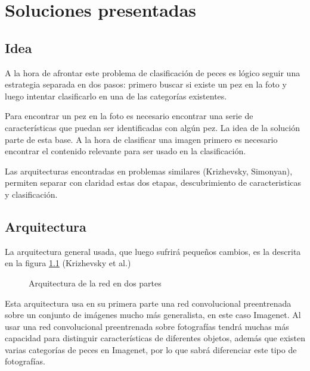 
\chapter{Soluciones presentadas} %

\label{ChapterX} %

\section{Idea}
A la hora de afrontar este problema de clasificación de peces es lógico
seguir una estrategia separada en dos pasos: primero buscar si
existe un pez en la foto y luego intentar clasificarlo en una de las 
categorías existentes. 

Para encontrar un pez en la foto es necesario encontrar una serie de
características que puedan ser identificadas con algún pez. La idea de 
la solución parte de esta base. A la hora de clasificar una imagen
primero es necesario encontrar el contenido relevante para ser usado
en la clasificación.

Las arquitecturas encontradas en problemas similares (Krizhevsky, Simonyan),
permiten separar con claridad estas dos etapas, descubrimiento de
caracteristicas y clasificación.

\section{Arquitectura}

La arquitectura general usada, que luego sufrirá pequeños cambios, es la descrita en la figura \ref{general-architecture} (Krizhevsky et al.)

\begin{figure}
  \caption{Arquitectura de la red en dos partes}
  \label{general-architecture}
\end{figure}

Esta arquitectura usa en su primera parte una red convolucional preentrenada sobre un conjunto de imágenes mucho más generalista, en este caso Imagenet. Al usar una red convolucional preentrenada sobre fotografías tendrá muchas más capacidad para distinguir características de diferentes objetos, además que existen varias categorías de peces en Imagenet, por lo que sabrá diferenciar este tipo de fotografías.


